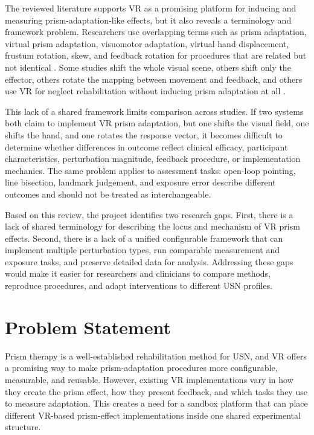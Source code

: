 The reviewed literature supports VR as a promising platform for inducing and measuring prism-adaptation-like effects, but it also reveals a terminology and framework problem. Researchers use overlapping terms such as prism adaptation, virtual prism adaptation, visuomotor adaptation, virtual hand displacement, frustum rotation, skew, and feedback rotation for procedures that are related but not identical \cite{Ramos2019,Bourgeois2021,cho2022feasibility,gerken2025sense}. Some studies shift the whole visual scene, others shift only the effector, others rotate the mapping between movement and feedback, and others use VR for neglect rehabilitation without inducing prism adaptation at all \cite{kim2017development,cho2022feasibility,Ramos2019,heyse2022patient,gerken2025sense}.

This lack of a shared framework limits comparison across studies. If two systems both claim to implement VR prism adaptation, but one shifts the visual field, one shifts the hand, and one rotates the response vector, it becomes difficult to determine whether differences in outcome reflect clinical efficacy, participant characteristics, perturbation magnitude, feedback procedure, or implementation mechanics. The same problem applies to assessment tasks: open-loop pointing, line bisection, landmark judgement, and exposure error describe different outcomes and should not be treated as interchangeable.

Based on this review, the project identifies two research gaps. First, there is a lack of shared terminology for describing the locus and mechanism of VR prism effects. Second, there is a lack of a unified configurable framework that can implement multiple perturbation types, run comparable measurement and exposure tasks, and preserve detailed data for analysis. Addressing these gaps would make it easier for researchers and clinicians to compare methods, reproduce procedures, and adapt interventions to different USN profiles.

\section{Problem Statement}
\label{sec:background-problem-statement}

Prism therapy is a well-established rehabilitation method for USN, and VR offers a promising way to make prism-adaptation procedures more configurable, measurable, and reusable. However, existing VR implementations vary in how they create the prism effect, how they present feedback, and which tasks they use to measure adaptation. This creates a need for a sandbox platform that can place different VR-based prism-effect implementations inside one shared experimental structure.

